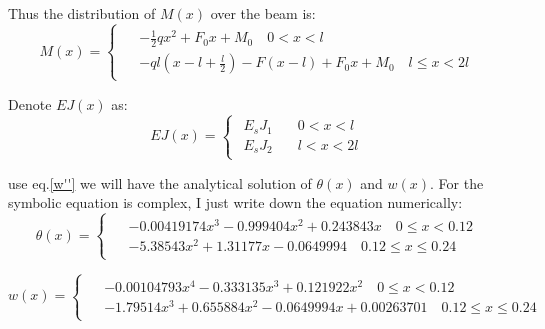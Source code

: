 Thus the distribution of $M(x)$ over the beam is:
\begin{equation}
    M(x)=
    \begin{cases}
        \begin{aligned}
            &
            -\frac{1}{2}qx^2 + F_0 x + M_0\quad 0< x < l\\
            &
            -ql\left(
                x-l+\frac{l}{2}
            \right)
            -F(x-l)
            +F_0 x
            +M_0\quad l\leq x < 2l
        \end{aligned}
    \end{cases}
\end{equation}

Denote $EJ(x)$ as:
\begin{equation}
    EJ(x)=
    \begin{cases}
        \begin{aligned}
            E_sJ_1&\quad 0< x < l\\
            E_sJ_2&\quad l< x < 2l
        \end{aligned}
    \end{cases}
\end{equation}

use eq.\ref{w''} we will have the analytical solution of $\theta(x)$ and $w(x)$. 
For the symbolic equation is complex, I just write down the equation numerically:
\begin{equation}
    \theta(x)=
    \begin{cases}
        \begin{aligned}
            &-0.00419174 x^3-0.999404 x^2+0.243843 x\quad 0\leq x < 0.12\\
            &-5.38543 x^2+1.31177 x-0.0649994\quad 0.12\leq x \leq 0.24
        \end{aligned}
    \end{cases}
\end{equation}

\begin{equation}
    w(x)=
    \begin{cases}
        \begin{aligned}
            &-0.00104793 x^4-0.333135 x^3+0.121922 x^2 \quad 0\leq x < 0.12\\
            &-1.79514 x^3+0.655884 x^2-0.0649994 x+0.00263701 \quad 0.12\leq x \leq 0.24
        \end{aligned}
    \end{cases}
\end{equation}

